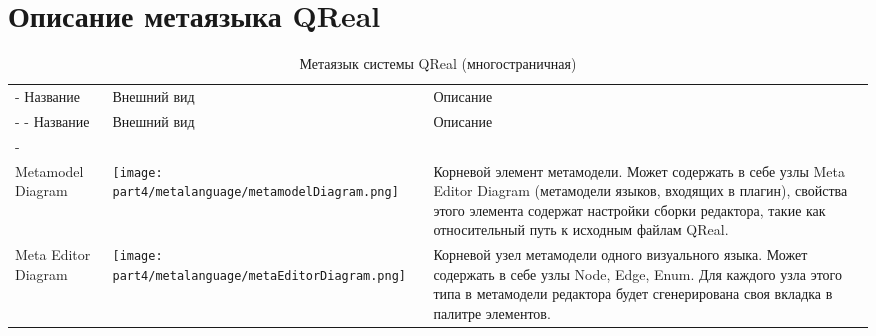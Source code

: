 \chapter{Описание метаязыка QReal} \label{appendixB}

\begin{center}
	\begin{longtabu} {| X[1 l m] | X[1.6 c m] | X[3 m] |}
		\caption{Метаязык системы QReal} \\
		\tabucline-
		Название                    & Внешний вид                                                                     & Описание \\
		\tabucline-
		\endfirsthead
		\tabucline-
		Название                    & Внешний вид                                                                     & Описание \\
		\tabucline-
		\endhead
		\noalign{\vspace{3mm}}\caption{Метаязык системы QReal (многостраничная)} \\
		\endfoot
		\everyrow{\tabucline-}
		Metamodel Diagram           & \texttt{[image: part4/metalanguage/metamodelDiagram.png]}              & Корневой элемент метамодели. Может содержать в себе 
		                                                                                                                узлы Meta Editor Diagram (метамодели языков, входящих в 
		                                                                                                                плагин), свойства этого элемента содержат настройки сборки 
		                                                                                                                редактора, такие как относительный путь к исходным файлам 
		                                                                                                                QReal. \\
		Meta Editor Diagram         & \texttt{[image: part4/metalanguage/metaEditorDiagram.png]}           & Корневой узел метамодели одного визуального языка. Может 
		                                                                                                                содержать в себе узлы Node, Edge, Enum. Для каждого узла 
		                                                                                                                этого типа в метамодели редактора будет сгенерирована своя 
		                                                                                                                вкладка в палитре элементов. \\

\end{longtabu}
\end{center}
